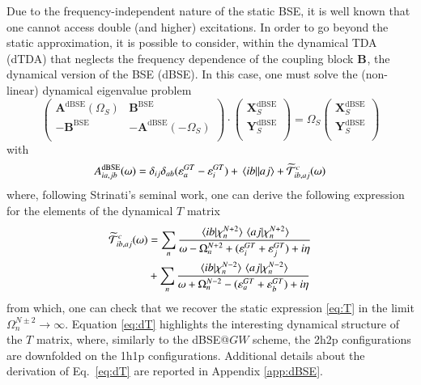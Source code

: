 \documentclass[aip,jcp,reprint,noshowkeys,superscriptaddress]{revtex4-1}
\newcommand{\BSE}{\text{BSE}}
\newcommand{\dBSE}{\text{dBSE}}
\newcommand{\GT}{GT}
\newcommand{\e}[2]{\eps_{#1}^{#2}}
\newcommand{\Om}[2]{\Omega_{#1}^{#2}}
\newcommand{\bA}[2]{\mathbf{A}_{#1}^{#2}}
\newcommand{\bB}[2]{\mathbf{B}_{#1}^{#2}}
\newcommand{\bX}[2]{\mathbf{X}_{#1}^{#2}}
\newcommand{\bY}[2]{\mathbf{Y}_{#1}^{#2}}
\newcommand{\eps}{\varepsilon}
\newcommand{\cT}{\mathcal{T}}
\begin{document}
Due to the frequency-independent nature of the static BSE, it is well known that one cannot access double (and higher) excitations.
\cite{Loos_2019,Romaniello_2009b,Sangalli_2011,Loos_2020h,Authier_2020,Monino_2021}
In order to go beyond the static approximation, it is possible to consider, within the dynamical TDA (dTDA) that neglects the frequency dependence of the coupling block $\bB{}{}$, the dynamical version of the BSE (dBSE). \cite{Strinati_1988,Romaniello_2009b,Loos_2020h}
In this case, one must solve the (non-linear) dynamical eigenvalue problem
\begin{equation}
\label{eq:dBSE}
	\begin{pmatrix}
		\bA{}{\dBSE}(\Om{S}{})	&	\bB{}{\BSE}	\\
		-\bB{}{\BSE}	&	-\bA{}{\dBSE}(-\Om{S}{})	\\
	\end{pmatrix}
	\cdot
	\begin{pmatrix}
		\bX{S}{\dBSE}	\\
		\bY{S}{\dBSE}	\\
	\end{pmatrix}
	=
	\Om{S}{}
	\begin{pmatrix}
		\bX{S}{\dBSE}	\\
		\bY{S}{\dBSE}	\\
	\end{pmatrix}
\end{equation}
with 
\begin{equation}
	A_{ia,jb}^{\dBSE}(\omega) = \delta_{ij} \delta_{ab} (\e{a}{\GT} - \e{i}{\GT}) + \mel{ib}{}{aj} + \widetilde{\cT}^c_{ib,aj}(\omega)
\end{equation}
where, following Strinati's seminal work, \cite{Strinati_1988} one can derive the following expression for the elements of the dynamical $T$ matrix
\begin{equation}
\label{eq:dT}
\begin{split}
	\widetilde{\cT}^c_{ib,aj}(\omega) 
		& = \sum_{n} \frac{\braket*{ib}{\chi_n^{N+2}}\braket*{aj}{\chi_n^{N+2}}}{\omega - \Om{n}{N+2} + (\e{i}{\GT} + \e{j}{\GT}) + i\eta}
		\\
		& + \sum_{n} \frac{\braket*{ib}{\chi_n^{N-2}}\braket*{aj}{\chi_n^{N-2}}}{\omega + \Om{n}{N-2} - (\e{a}{\GT} + \e{b}{\GT}) + i\eta}
\end{split}
\end{equation}
from which, one can check that we recover the static expression \eqref{eq:T} in the limit $\Om{n}{N\pm2} \to \infty$.
Equation \eqref{eq:dT} highlights the interesting dynamical structure of the $T$ matrix, where, similarly to the dBSE@$GW$ scheme, \cite{Strinati_1988,Romaniello_2009b,Loos_2020h} the 2h2p configurations are downfolded on the 1h1p configurations. \cite{Bintrim_2021b}
Additional details about the derivation of Eq.~\eqref{eq:dT} are reported in Appendix \ref{app:dBSE}.
\end{document}

